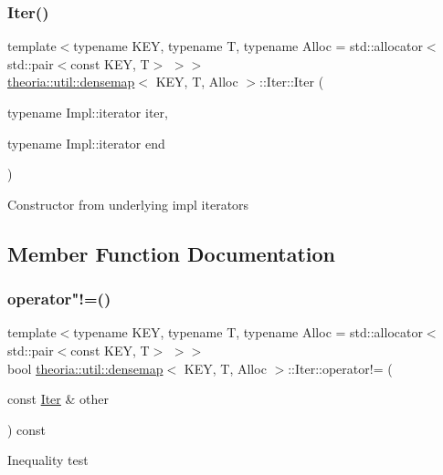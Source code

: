 \subsubsection{\texorpdfstring{Iter()}{Iter()}\hspace{0.1cm}{\footnotesize\ttfamily [3/3]}}
{\footnotesize\ttfamily template$<$typename K\+EY, typename T, typename Alloc = std\+::allocator$<$std\+::pair$<$const K\+E\+Y, T$>$ $>$$>$ \\
\hyperlink{classtheoria_1_1util_1_1densemap}{theoria\+::util\+::densemap}$<$ K\+EY, T, Alloc $>$\+::Iter\+::\+Iter (\begin{DoxyParamCaption}\item[{typename Impl\+::iterator}]{iter,  }\item[{typename Impl\+::iterator}]{end }\end{DoxyParamCaption})\hspace{0.3cm}{\ttfamily [inline]}}

Constructor from underlying impl iterators 

\subsection{Member Function Documentation}
\mbox{\label{classtheoria_1_1util_1_1densemap_1_1Iter_a3b85c5cb2f068ade9fcf8c8547aacea3}} 
\subsubsection{\texorpdfstring{operator"!=()}{operator!=()}}
{\footnotesize\ttfamily template$<$typename K\+EY, typename T, typename Alloc = std\+::allocator$<$std\+::pair$<$const K\+E\+Y, T$>$ $>$$>$ \\
bool \hyperlink{classtheoria_1_1util_1_1densemap}{theoria\+::util\+::densemap}$<$ K\+EY, T, Alloc $>$\+::Iter\+::operator!= (\begin{DoxyParamCaption}\item[{const \hyperlink{classtheoria_1_1util_1_1densemap_1_1Iter}{Iter} \&}]{other }\end{DoxyParamCaption}) const\hspace{0.3cm}{\ttfamily [inline]}}

Inequality test \mbox{\label{classtheoria_1_1util_1_1densemap_1_1Iter_ae290045c043b2c9ea6ff17a91217cb04}} 
